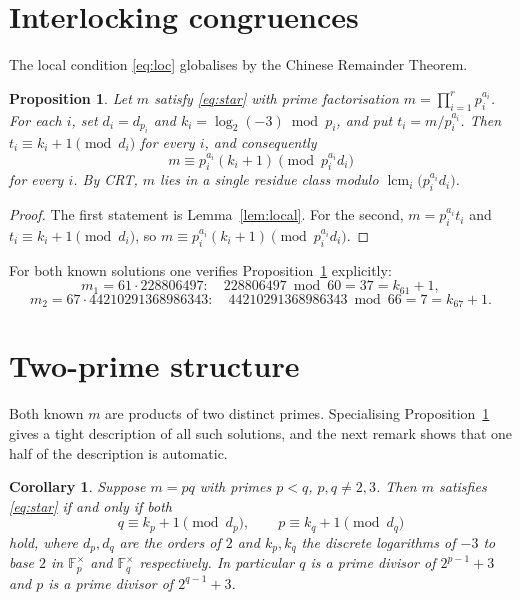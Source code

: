 \documentclass[11pt,reqno]{amsart}
\theoremstyle{plain}
\newtheorem{proposition}{Proposition}
\newtheorem{corollary}{Corollary}
\theoremstyle{definition}
\theoremstyle{remark}
\newcommand{\F}{\mathbb{F}}
\DeclareMathOperator{\lcm}{lcm}
\begin{document}
\section{Interlocking congruences}\label{sec:interlock}

The local condition \eqref{eq:loc} globalises by the Chinese Remainder Theorem.

\begin{proposition}\label{prop:crt}
Let $m$ satisfy \eqref{eq:star} with prime factorisation $m=\prod_{i=1}^{r}p_{i}^{a_{i}}$. For
each $i$, set $d_{i}=d_{p_{i}}$ and $k_{i}=\log_{2}(-3)\bmod p_{i}$, and put $t_{i}=m/p_{i}^{a_{i}}$.
Then $t_{i}\equiv k_{i}+1\pmod{d_{i}}$ for every $i$, and consequently
\[
m\equiv p_{i}^{a_{i}}(k_{i}+1)\pmod{p_{i}^{a_{i}}d_{i}}
\]
for every $i$. By CRT, $m$ lies in a single residue class modulo
$\lcm_{i}\!\big(p_{i}^{a_{i}}d_{i}\big)$.
\end{proposition}

\begin{proof}
The first statement is Lemma~\ref{lem:local}. For the second, $m=p_{i}^{a_{i}}t_{i}$ and
$t_{i}\equiv k_{i}+1\pmod{d_{i}}$, so $m\equiv p_{i}^{a_{i}}(k_{i}+1)\pmod{p_{i}^{a_{i}}d_{i}}$.
\end{proof}

For both known solutions one verifies Proposition~\ref{prop:crt} explicitly:
\[
m_{1}=61\cdot 228806497:\quad 228806497 \bmod 60 = 37 = k_{61}+1,
\]
\[
m_{2}=67\cdot 44210291368986343:\quad 44210291368986343 \bmod 66 = 7 = k_{67}+1.
\]

\section{Two-prime structure}\label{sec:twoprime}

Both known $m$ are products of two distinct primes. Specialising Proposition~\ref{prop:crt}
gives a tight description of all such solutions, and the next remark shows that one half of the
description is automatic.

\begin{corollary}\label{cor:twoprime}
Suppose $m=pq$ with primes $p<q$, $p,q\ne 2,3$. Then $m$ satisfies \eqref{eq:star} if and only
if both
\begin{equation}\label{eq:pair}
q\equiv k_{p}+1\pmod{d_{p}},\qquad p\equiv k_{q}+1\pmod{d_{q}}
\end{equation}
hold, where $d_{p},d_{q}$ are the orders of $2$ and $k_{p},k_{q}$ the discrete logarithms of
$-3$ to base $2$ in $\F_{p}^{\times}$ and $\F_{q}^{\times}$ respectively. In particular $q$ is a
prime divisor of $2^{p-1}+3$ and $p$ is a prime divisor of $2^{q-1}+3$.
\end{corollary}
\end{document}
